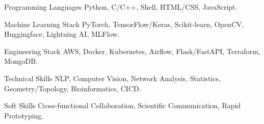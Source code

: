 

\begin{cvskills}

  \cvskill
    {Programming Languages} %
    {Python, C/C++, Shell, HTML/CSS, JavaScript.} %

  \cvskill
    {Machine Learning Stack} %
    {PyTorch, TensorFlow/Keras, Scikit‑learn, OpenCV, Huggingface, Lightning AI, MLFlow.} %

  \cvskill
    {Engineering Stack} %
    {AWS, Docker, Kubernetes, Airflow, Flask/FastAPI, Terraform, MongoDB.} %
    
  \cvskill
    {Technical Skills} %
    {NLP, Computer Vision, Network Analysis, Statistics, Geometry/Topology, Bioinformatics, CICD.} %

  \cvskill
    {Soft Skills} %
    {Cross-functional Collaboration, Scientific Communication, Rapid Prototyping.} %

\end{cvskills}
